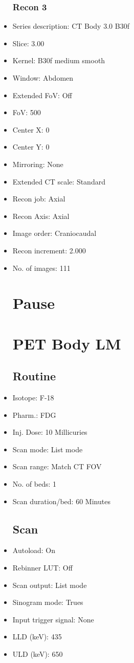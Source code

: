 \documentclass[12pt]{article}
\begin{document}
\begin{itemize}[noitemsep]
\subsubsection{Recon 3}
\item Series description: CT Body 3.0 B30f
\item Slice: 3.00
\item Kernel: B30f medium smooth
\item Window: Abdomen
\item Extended FoV: Off
\item FoV: 500
\item Center X: 0
\item Center Y: 0
\item Mirroring: None
\item Extended CT scale: Standard
\item Recon job: Axial
\item Recon Axis: Axial
\item Image order: Craniocaudal
\item Recon increment: 2.000
\item No. of images: 111
\section{Pause}
\section{PET Body LM}\subsection{Routine}
\item Isotope: F-18
\item Pharm.: FDG
\item Inj. Dose: 10 Millicuries
\item Scan mode: List mode
\item Scan range: Match CT FOV
\item No. of beds: 1
\item Scan duration/bed: 60 Minutes
\subsection{Scan}
\item Autoload: On
\item Rebinner LUT: Off
\item Scan output: List mode
\item Sinogram mode: Trues
\item Input trigger signal: None
\item LLD (keV): 435
\item ULD (keV): 650

\end{itemize}
\end{document}
